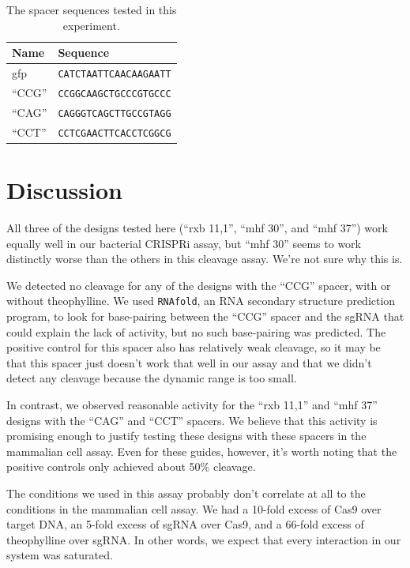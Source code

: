 \documentclass{article}
\begin{document}
\begin{table}[h!]
 \centering
 \begin{tabular}{ll}
  \toprule
  Name    & Sequence             \\
  \midrule
  gfp     & \texttt{CATCTAATTCAACAAGAATT} \\
  ``CCG'' & \texttt{CCGGCAAGCTGCCCGTGCCC} \\
  ``CAG'' & \texttt{CAGGGTCAGCTTGCCGTAGG} \\
  ``CCT'' & \texttt{CCTCGAACTTCACCTCGGCG} \\
  \bottomrule
 \end{tabular}
 \caption{The spacer sequences tested in this experiment.}
\end{table}

\section{Discussion}

All three of the designs tested here (``rxb 11,1'', ``mhf 30'', and ``mhf 37'') 
work equally well in our bacterial CRISPRi assay, but ``mhf 30'' seems to work 
distinctly worse than the others in this cleavage assay.  We're not sure why 
this is.

We detected no cleavage for any of the designs with the ``CCG'' spacer, with or 
without theophylline.  We used \texttt{RNAfold}, an RNA secondary structure 
prediction program, to look for base-pairing between the ``CCG'' spacer and the 
sgRNA that could explain the lack of activity, but no such base-pairing was 
predicted.  The positive control for this spacer also has relatively weak 
cleavage, so it may be that this spacer just doesn't work that well in our 
assay and that we didn't detect any cleavage because the dynamic range is too 
small.  

In contrast, we observed reasonable activity for the ``rxb 11,1'' and ``mhf 
37'' designs with the ``CAG'' and ``CCT'' spacers.  We believe that this 
activity is promising enough to justify testing these designs with these 
spacers in the mammalian cell assay.  Even for these guides, however, it's 
worth noting that the positive controls only achieved about 50\% cleavage.

The conditions we used in this assay probably don't correlate at all to the 
conditions in the mammalian cell assay.  We had a 10-fold excess of Cas9 over 
target DNA, an 5-fold excess of sgRNA over Cas9, and a 66-fold excess of 
theophylline over sgRNA.  In other words, we expect that every interaction in 
our system was saturated.
\end{document}
